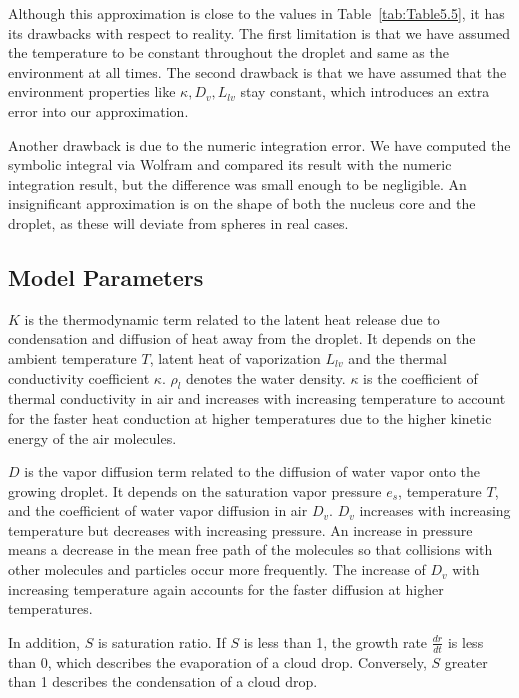 \documentclass[]{article}
\begin{document}
Although this approximation is close to the values in Table~\ref{tab:Table5.5},
it has its drawbacks with respect to reality. The first limitation is that we
have assumed the temperature to be constant throughout the droplet and same as
the environment at all times. The second drawback is that we have assumed that
the environment properties like $\kappa, D_{v}, L_{lv}$ stay constant, which
introduces an extra error into our approximation.

Another drawback is due to the numeric integration error. We have computed the
symbolic integral via Wolfram and compared its result with the numeric
integration result, but the difference was small enough to be negligible. An
insignificant approximation is on the shape of both the nucleus core and the
droplet, as these will deviate from spheres in real cases.


\subsection{Model Parameters}
$K$ is the thermodynamic term related to the latent heat release due to
condensation and diffusion of heat away from the droplet. It depends on the
ambient temperature $T$, latent heat of vaporization $L_{lv}$ and the thermal
conductivity coefficient $\kappa$. $\rho_l$ denotes the water density.
$\kappa$ is the coefficient of thermal conductivity in air and increases with
increasing temperature to account for the faster heat conduction at higher
temperatures due to the higher kinetic energy of the air molecules.

$D$ is the vapor diffusion term related to the diffusion of water vapor onto
the growing droplet. It depends on the saturation vapor pressure $e_{s}$,
temperature $T$, and the coefficient of water vapor diffusion in air $D_v$.
$D_v$ increases with increasing temperature but decreases with increasing
pressure. An increase in pressure means a decrease in the mean free path of the
molecules so that collisions with other molecules and particles occur more
frequently. The increase of  $D_v$ with increasing temperature again accounts
for the faster diffusion at higher temperatures.

In addition, $S$ is saturation ratio. If $S$ is less than 1, the growth rate
$\frac{dr}{dt}$ is less than 0, which describes the evaporation of a cloud
drop. Conversely, $S$ greater than 1 describes the condensation of a cloud
drop.
\end{document}
